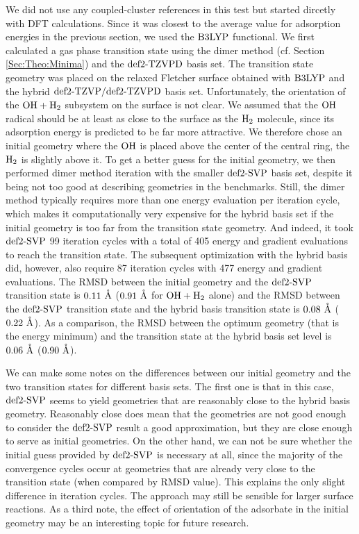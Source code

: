 \documentclass[8.5pt,twoside,twocolumn]{article}
\renewcommand{\Ang}{\mathring{\te{A}}}
\theoremstyle{standard}
\begin{document}
We did not use any coupled-cluster references in this test but started
dircetly with DFT calculations. Since it was closest to the average value for
adsorption energies in the previous section, we used the $\text{B3LYP}$ functional.
We first calculated a gas phase transition state using the dimer method (cf.
Section \ref{Sec:Theo:Minima}) and the $\text{def2-TZVPD}$ basis set. The transition
state geometry was placed on the relaxed Fletcher surface obtained with
$\text{B3LYP}$ and the hybrid $\text{def2-TZVP}/\text{def2-TZVPD}$ basis set. Unfortunately, the orientation
of the $\mbox{\ensuremath{\text O \text H+\text H_2}}$ subsystem on the surface is not clear. We assumed that the $\text O \text H$
radical should be at least as close to the surface as the $\text H_2$ molecule, since
its adsorption energy is predicted to be far more attractive. We therefore
chose an initial geometry where the $\text O \text H$ is placed above the center of the
central ring, the $\text H_2$ is slightly above it. To get a better guess for the
initial geometry, we then performed dimer method iteration with the smaller
$\text{def2-SVP}$ basis set, despite it being not too good at describing geometries in the
benchmarks. Still, the dimer method typically requires more than one energy
evaluation per iteration cycle, which makes it computationally very expensive
for the hybrid basis set if the initial geometry is too far from the transition
state geometry. And indeed, it took $\text{def2-SVP}$ 99 iteration cycles with a total of
405 energy and gradient evaluations to reach the transition state. The
subsequent optimization with the hybrid basis did, however, also require
87 iteration cycles with 477 energy and gradient evaluations. The RMSD between
the initial geometry and the $\text{def2-SVP}$ transition state is $0.11~\Ang$
($0.91~\Ang$ for $\mbox{\ensuremath{\text O \text H+\text H_2}}$ alone) and the RMSD between the $\text{def2-SVP}$
transition state and the hybrid basis transition state is $0.08~\Ang$
($0.22~\Ang$). As a comparison, the RMSD between the optimum geometry
(that is the energy minimum) and the transition state at the hybrid basis set
level is $0.06~\Ang$ ($0.90~\Ang$).

We can make some notes on the differences between our initial geometry and the
two transition states for different basis sets. The first one is that in this
case, $\text{def2-SVP}$ seems to yield geometries that are reasonably close to the hybrid
basis geometry. Reasonably close does mean that the geometries are not good
enough to consider the $\text{def2-SVP}$ result a good approximation, but they are close
enough to serve as initial geometries. On the other hand, we can not be sure
whether the initial guess provided by $\text{def2-SVP}$ is necessary at all, since the
majority of the convergence cycles occur at geometries that are already very
close to the transition state (when compared by RMSD value). This explains the
only slight difference in iteration cycles. The approach may still be sensible
for larger surface reactions. As a third note, the effect of orientation of the
adsorbate in the initial geometry may be an interesting topic for future
research.
\end{document}
